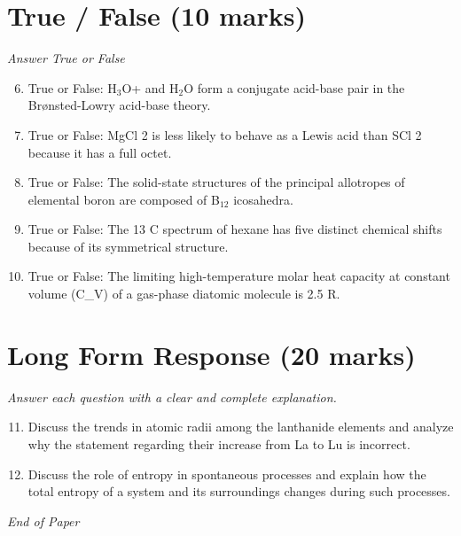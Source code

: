 \documentclass[12pt]{article}
\begin{document}
\section*{True / False (10 marks)}
\textit{Answer True or False}
\begin{enumerate}[label=\arabic*.]
\setcounter{enumi}{5}
\item True or False: H$_{3}$O+ and H$_{2}$O form a conjugate acid-base pair in the Brønsted-Lowry acid-base theory.
\item True or False: MgCl 2 is less likely to behave as a Lewis acid than SCl 2 because it has a full octet.
\item True or False: The solid-state structures of the principal allotropes of elemental boron are composed of B$_{12}$ icosahedra.
\item True or False: The 13 C spectrum of hexane has five distinct chemical shifts because of its symmetrical structure.
\item True or False: The limiting high-temperature molar heat capacity at constant volume (C\_V) of a gas-phase diatomic molecule is 2.5 R.
\end{enumerate}

\section*{Long Form Response (20 marks)}
\textit{Answer each question with a clear and complete explanation.}
\begin{enumerate}[label=\arabic*.]
\setcounter{enumi}{10}
\item Discuss the trends in atomic radii among the lanthanide elements and analyze why the statement regarding their increase from La to Lu is incorrect.
\item Discuss the role of entropy in spontaneous processes and explain how the total entropy of a system and its surroundings changes during such processes.
\end{enumerate}

\vfill
\noindent\textit{End of Paper}
\end{document}
